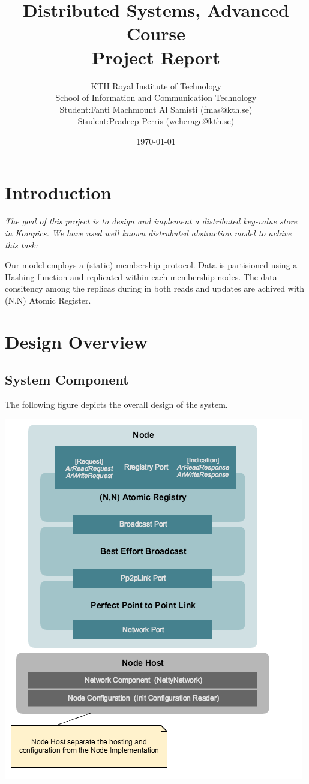 \documentclass[a4paper, 11pt]{article}
\title{Distributed Systems, Advanced Course \\ 
		Project Report}
\author{KTH Royal Institute of Technology \\ 
	School of Information and Communication Technology \\
	Student:Fanti Machmount Al Samisti (fmas@kth.se) \\
	Student:Pradeep Perris (weherage@kth.se)}
\date{\today{}}
\begin{document}
\maketitle

\tableofcontents

\clearpage

\section{Introduction}

\textit{The goal of this project is to design and implement a distributed key-value store in Kompics. We have used well known distrubuted abstraction model to achive this task: }

Our model employs a (static) membership protocol. Data is partisioned using a Hashing function and replicated within each membership nodes. The data consitency among the replicas during in both reads and updates are achived with (N,N) Atomic Register.

\section{Design Overview}

\subsection{System Component}
The following figure depicts the overall design of the system.

{\centering\includegraphics[scale = 0.8]{./images/design_overview.png}\par}
\end{document}
